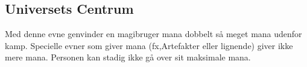\subsection*{Universets Centrum}

Med denne evne genvinder en magibruger mana dobbelt så meget mana udenfor kamp. Specielle evner som giver mana (fx,Artefakter eller lignende) giver ikke mere mana. Personen kan stadig ikke gå over sit maksimale mana.